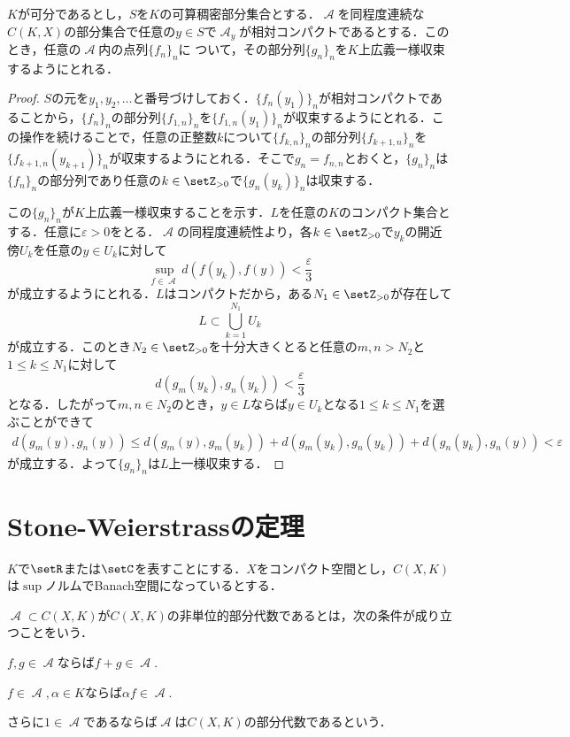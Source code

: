 \documentclass[uplatex]{jsarticle}
\begin{document}
\begin{theorem}
    $K$が可分であるとし，$S$を$K$の可算稠密部分集合とする．$\mscrA$を同程度連続な$C(K,X)$の部分集合で任意の$y\in S$で$\mscrA_{y}$が相対コンパクトであるとする．このとき，任意の$\mscrA$内の点列$\{f_n\}_n$に
    ついて，その部分列$\{g_n\}_n$を$K$上広義一様収束するようにとれる．
\end{theorem}
\begin{proof}
    $S$の元を$y_1,y_2,\dots$と番号づけしておく．$\{f_n(y_1)\}_n$が相対コンパクトであることから，$\{f_n\}_n$の部分列$\{f_{1,n}\}_n$を$\{f_{1,n}(y_1)\}_n$が収束するようにとれる．この操作を続けることで，任意の正整数$k$について$\{f_{k,n}\}_n$の部分列$\{f_{k+1,n}\}_n$を$\{f_{k+1,n}(y_{k+1})\}_n$が収束するようにとれる．そこで$g_n=f_{n,n}$とおくと，$\{g_n\}_n$は$\{f_n\}_n$の部分列であり任意の$k\in \setZ_{>0}$で$\{g_n(y_k)\}_n$は収束する．

    この$\{g_n\}_n$が$K$上広義一様収束することを示す．$L$を任意の$K$のコンパクト集合とする．任意に$\varepsilon>0$をとる．$\mscrA$の同程度連続性より，各$k\in \setZ_{>0}$で$y_k$の開近傍$U_k$を任意の$y\in U_k$に対して
    \[ \sup_{f\in \mscrA} d(f(y_k),f(y)) < \frac{\varepsilon}{3} \]
    が成立するようにとれる．$L$はコンパクトだから，ある$N_1\in \setZ_{>0}$が存在して
    \[ L \subset \bigcup_{k=1}^{N_1} U_k \]
    が成立する．このとき$N_2\in \setZ_{>0}$を十分大きくとると任意の$m,n>N_2$と$1\leq k\leq N_1$に対して
    \[ d(g_m(y_k),g_n(y_k)) < \frac{\varepsilon}{3} \]
    となる．したがって$m,n\in N_2$のとき，$y\in L$ならば$y\in U_k$となる$1\leq k \leq N_1$を選ぶことができて
    \begin{align*}
        d(g_m(y),g_n(y)) \leq d(g_m(y),g_m(y_k)) + d(g_m(y_k),g_n(y_k)) + d(g_n(y_k),g_n(y)) < \varepsilon
    \end{align*}
    が成立する．よって$\{g_n\}_n$は$L$上一様収束する．
\end{proof}

\section{Stone-Weierstrassの定理}
$K$で$\setR$または$\setC$を表すことにする．$X$をコンパクト空間とし，$C(X,K)$は$\sup$ノルムでBanach空間になっているとする．

\begin{definition}
    $\mscrA\subset C(X,K)$が$C(X,K)$の非単位的部分代数であるとは，次の条件が成り立つことをいう．
    \begin{enumarabicp}
        \item $f,g\in \mscrA$ならば$f+g\in \mscrA.$
        \item $f\in \mscrA,\alpha\in K$ならば$\alpha f\in \mscrA.$
    \end{enumarabicp}
    さらに$1\in \mscrA$であるならば$\mscrA$は$C(X,K)$の部分代数であるという．
\end{definition}
\end{document}
